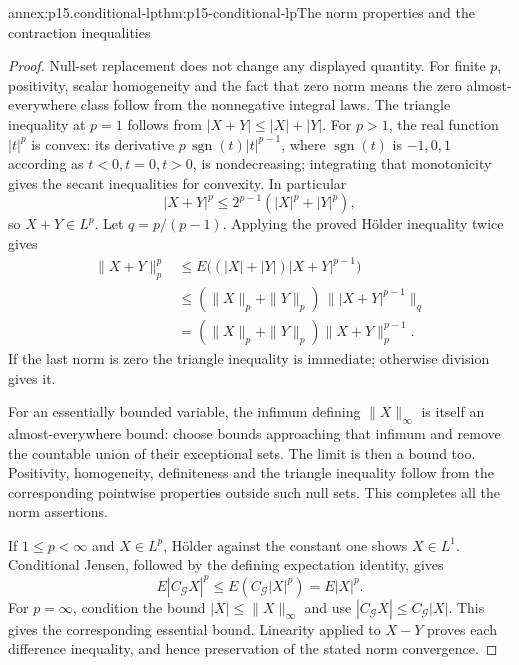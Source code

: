 \begin{annexitem}{annex:p15.conditional-lp}{thm:p15-conditional-lp}{The norm properties and the contraction inequalities}
\begin{proof}
Null-set replacement does not change any displayed quantity.
For finite \(p\), positivity, scalar homogeneity and the fact that
zero norm means the zero almost-everywhere class follow from the
nonnegative integral laws. The triangle inequality at \(p=1\)
follows from \(|X+Y|\leq|X|+|Y|\).
For \(p>1\), the real function \(|t|^p\) is convex: its derivative
\(p\,\operatorname{sgn}(t)|t|^{p-1}\), where
\(\operatorname{sgn}(t)\) is \(-1,0,1\) according as \(t<0,t=0,t>0\),
is nondecreasing; integrating that monotonicity gives the secant
inequalities for convexity. In particular
\[
                    |X+Y|^p\leq2^{p-1}(|X|^p+|Y|^p),
\]
so \(X+Y\in L^p\).
Let \(q=p/(p-1)\). Applying the proved H\"older inequality twice gives
\[
 \begin{aligned}
 \|X+Y\|_p^p
   &\leq E\bigl((|X|+|Y|)|X+Y|^{p-1}\bigr)\\
   &\leq(\|X\|_p+\|Y\|_p)\,\bigl\||X+Y|^{p-1}\bigr\|_q\\
   &=(\|X\|_p+\|Y\|_p)\|X+Y\|_p^{p-1}.
 \end{aligned}
\]
If the last norm is zero the triangle inequality is immediate;
otherwise division gives it.

For an essentially bounded variable, the infimum defining
\(\|X\|_\infty\) is itself an almost-everywhere bound:
choose bounds approaching that infimum and remove the countable
union of their exceptional sets. The limit is then a bound too.
Positivity, homogeneity, definiteness and the triangle inequality
follow from the corresponding pointwise properties outside such
null sets. This completes all the norm assertions.

If \(1\leq p<\infty\) and \(X\in L^p\), H\"older against the constant
one shows \(X\in L^1\). Conditional Jensen, followed by the defining
expectation identity, gives
\[
                    E|C_{\mathcal G}X|^p
                       \leq E(C_{\mathcal G}|X|^p)=E|X|^p.
\]
For \(p=\infty\), condition the bound \(|X|\leq\|X\|_\infty\)
and use \(|C_{\mathcal G}X|\leq C_{\mathcal G}|X|\).
This gives the corresponding essential bound.
Linearity applied to \(X-Y\) proves each difference inequality,
and hence preservation of the stated norm convergence.
\end{proof}
\end{annexitem}

